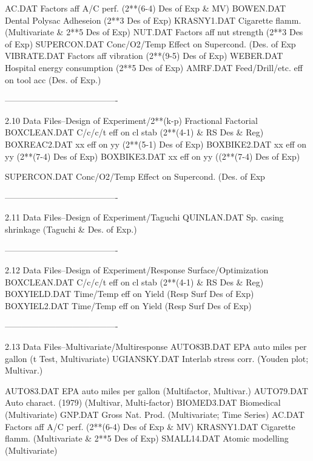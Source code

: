       AC.DAT        Factors aff A/C perf. (2**(6-4) Des of Exp & MV)
      BOWEN.DAT     Dental Polysac Adheseion (2**3 Des of Exp)
      KRASNY1.DAT   Cigarette flamm. (Multivariate & 2**5 Des of Exp)
      NUT.DAT       Factors aff nut strength (2**3 Des of Exp)
      SUPERCON.DAT  Conc/O2/Temp Effect on Supercond. (Des. of Exp
      VIBRATE.DAT   Factors aff vibration (2**(9-5) Des of Exp)
      WEBER.DAT     Hospital energy consumption (2**5 Des of Exp)
      AMRF.DAT      Feed/Drill/etc. eff on tool acc (Des. of Exp.)
 
 
 
 
 
----------------------------------------
 
2.10
Data Files--Design of Experiment/2**(k-p) Fractional Factorial
      BOXCLEAN.DAT  C/c/c/t eff on cl stab (2**(4-1) & RS Des & Reg)
      BOXREAC2.DAT  xx eff on yy (2**(5-1) Des of Exp)
      BOXBIKE2.DAT  xx eff on yy (2**(7-4) Des of Exp)
      BOXBIKE3.DAT  xx eff on yy ((2**(7-4) Des of Exp)
 
      SUPERCON.DAT  Conc/O2/Temp Effect on Supercond. (Des. of Exp
 
 
 
 
----------------------------------------
 
2.11
Data Files--Design of Experiment/Taguchi
      QUINLAN.DAT   Sp. casing shrinkage (Taguchi & Des. of Exp.)
 
 
 
 
----------------------------------------
 
2.12
Data Files--Design of Experiment/Response Surface/Optimization
      BOXCLEAN.DAT  C/c/c/t eff on cl stab (2**(4-1) & RS Des & Reg)
      BOXYIELD.DAT  Time/Temp eff on Yield (Resp Surf Des of Exp)
      BOXYIEL2.DAT  Time/Temp eff on Yield (Resp Surf Des of Exp)
 
 
 
 
----------------------------------------
 
2.13
Data Files--Multivariate/Multiresponse
      AUTO83B.DAT   EPA auto miles per gallon (t Test, Multivariate)
      UGIANSKY.DAT  Interlab stress corr. (Youden plot; Multivar.)
 
      AUTO83.DAT    EPA auto miles per gallon (Multifactor, Multivar.)
      AUTO79.DAT    Auto charact. (1979) (Multivar, Multi-factor)
      BIOMED3.DAT   Biomedical (Multivariate)
      GNP.DAT       Gross Nat. Prod. (Multivariate; Time Series)
      AC.DAT        Factors aff A/C perf. (2**(6-4) Des of Exp & MV)
      KRASNY1.DAT   Cigarette flamm. (Multivariate & 2**5 Des of Exp)
      SMALL14.DAT   Atomic modelling (Multivariate)
 
